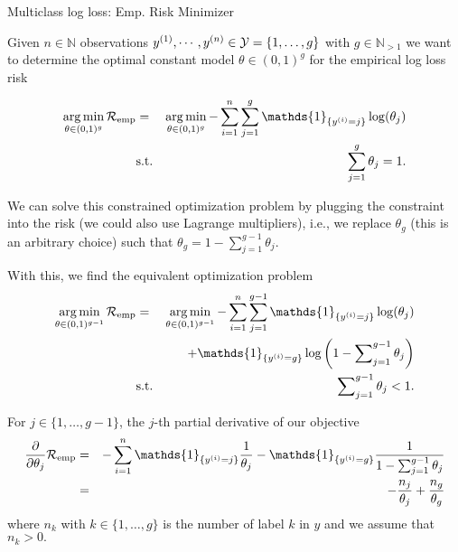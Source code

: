\documentclass[11pt,compress,t,notes=noshow, xcolor=table]{beamer}
\newcommand{\argminl}{\mathop{\operatorname{arg\,min}}\limits}
\begin{document}
\begin{vbframe}{Multiclass log loss: Emp. Risk Minimizer}

Given $n \in \mathbb{N}$ observations $y^{(1)}, \cdots, y^{(n)} \in \mathcal{Y} = \{1, \dots, g\}$ with $g\in\mathbb{N}_{>1}$ we want to determine the optimal constant model $\theta \in (0,1)^g$ for the empirical log loss risk

\begin{eqnarray*}
  \argminl_{\theta \in (0, 1)^g}\riske   &=& 
  \argminl_{\theta \in (0, 1)^g}-\sum^n_{i=1}\sum^g_{j=1} \mathds{1}_{\{y^{(i)} = j\}}\log(\theta_j) \\
  &\text{s.t.}& \sum^g_{j=1}\theta_j = 1.
\end{eqnarray*}

We can solve this constrained optimization problem by plugging the constraint into the risk (we could also use Lagrange multipliers), i.e., we replace $\theta_g$ (this is an arbitrary choice) such that $
 \theta_g = 1 - \sum^{g-1}_{j=1}\theta_j.
$

\framebreak 
With this, we find the equivalent optimization problem
\begin{eqnarray*}
  \argminl_{\theta \in (0, 1)^{g-1}}\riske  & = & \argminl_{\theta \in (0, 1)^{g-1}}
  -\sum^n_{i=1}\sum^{g-1}_{j=1} \mathds{1}_{\{y^{(i)} = j\}}\log(\theta_j) \\ 
  &&+ \mathds{1}_{\{y^{(i)} = g\}}\log\left(1 - \sum\nolimits^{g-1}_{j=1}\theta_j\right) \\
  &\text{s.t.}&  \sum\nolimits^{g-1}_{j=1}\theta_j < 1.
\end{eqnarray*}

For $j \in \{1,\dots,g-1\}$, the $j$-th partial derivative of our objective 
\begin{eqnarray*}
 \frac{\partial}{\partial \theta_j}\riske  & = & 
  -\sum^n_{i=1} \mathds{1}_{\{y^{(i)} = j\}}\frac{1}{\theta_j} - \mathds{1}_{\{y^{(i)} = g\}}\frac{1}{1 - \sum^{g-1}_{j=1}\theta_j} \\
  & = & -\frac{n_j}{\theta_j} + \frac{n_g}{\theta_g}
\end{eqnarray*}
where $n_k$ with $k\in \{1,\dots, g\}$ is the number of label $k$ in $y$ and we assume that $n_k > 0.$

\framebreak


\end{vbframe}
\end{document}
